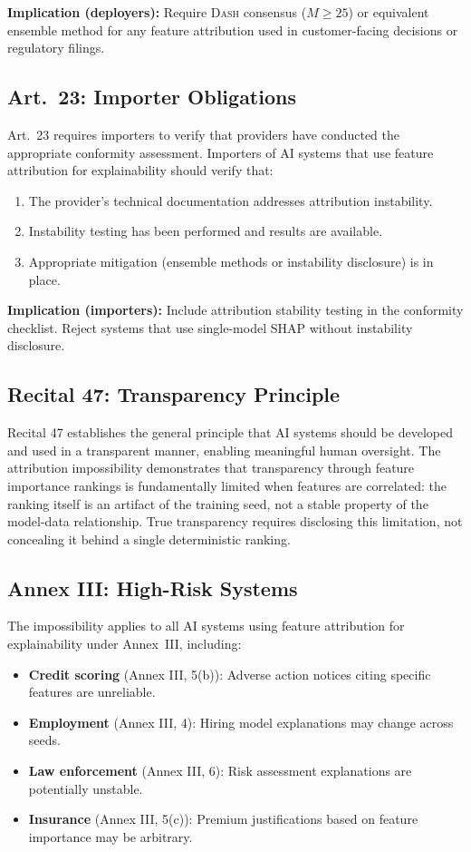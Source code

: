 \documentclass{article}
\newcommand{\DASH}{\textsc{Dash}}
\begin{document}
\textbf{Implication (deployers):} Require \DASH{} consensus ($M \geq 25$) or equivalent ensemble method for any feature attribution used in customer-facing decisions or regulatory filings.

\subsection*{Art.~23: Importer Obligations}

Art.~23 requires importers to verify that providers have conducted the appropriate conformity assessment. Importers of AI systems that use feature attribution for explainability should verify that:
\begin{enumerate}
    \item The provider's technical documentation addresses attribution instability.
    \item Instability testing has been performed and results are available.
    \item Appropriate mitigation (ensemble methods or instability disclosure) is in place.
\end{enumerate}

\textbf{Implication (importers):} Include attribution stability testing in the conformity checklist. Reject systems that use single-model SHAP without instability disclosure.

\subsection*{Recital 47: Transparency Principle}

Recital 47 establishes the general principle that AI systems should be developed and used in a transparent manner, enabling meaningful human oversight. The attribution impossibility demonstrates that transparency through feature importance rankings is fundamentally limited when features are correlated: the ranking itself is an artifact of the training seed, not a stable property of the model-data relationship. True transparency requires disclosing this limitation, not concealing it behind a single deterministic ranking.

\subsection*{Annex III: High-Risk Systems}

The impossibility applies to all AI systems using feature attribution for explainability under Annex~III, including:
\begin{itemize}
    \item \textbf{Credit scoring} (Annex III, 5(b)): Adverse action notices citing specific features are unreliable.
    \item \textbf{Employment} (Annex III, 4): Hiring model explanations may change across seeds.
    \item \textbf{Law enforcement} (Annex III, 6): Risk assessment explanations are potentially unstable.
    \item \textbf{Insurance} (Annex III, 5(c)): Premium justifications based on feature importance may be arbitrary.
\end{itemize}
\end{document}

